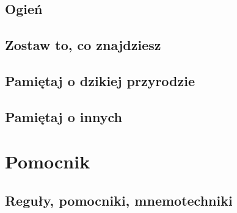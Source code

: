 \documentclass[11pt,fleqn]{book} %
\begin{document}
\chapter{Ogień}
\label{rule4-fire}


\chapter{Zostaw to, co znajdziesz}
\label{rule5-leave}


\chapter{Pamiętaj o dzikiej przyrodzie}
\label{rule6-wildlife}


\chapter{Pamiętaj o innych}
\label{rule7-others}


\part{Pomocnik}



\chapter{Reguły, pomocniki, mnemotechniki}
\end{document}
